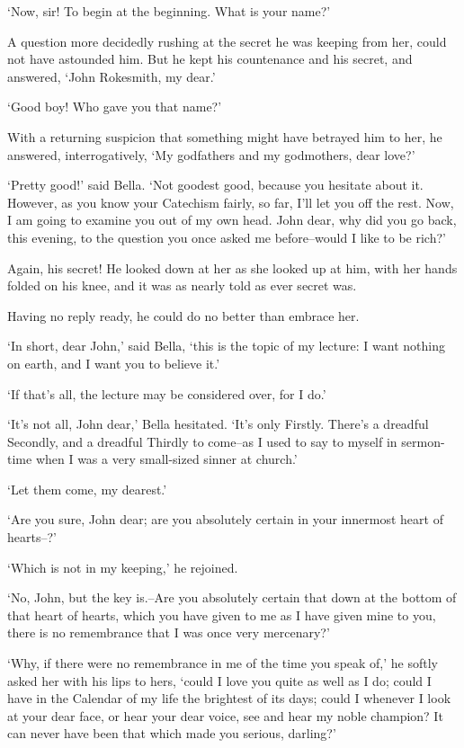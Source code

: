 ‘Now, sir! To begin at the beginning. What is your name?’

A question more decidedly rushing at the secret he was keeping from
her, could not have astounded him. But he kept his countenance and his
secret, and answered, ‘John Rokesmith, my dear.’

‘Good boy! Who gave you that name?’

With a returning suspicion that something might have betrayed him to
her, he answered, interrogatively, ‘My godfathers and my godmothers,
dear love?’

‘Pretty good!’ said Bella. ‘Not goodest good, because you hesitate about
it. However, as you know your Catechism fairly, so far, I’ll let you off
the rest. Now, I am going to examine you out of my own head. John dear,
why did you go back, this evening, to the question you once asked me
before--would I like to be rich?’

Again, his secret! He looked down at her as she looked up at him, with
her hands folded on his knee, and it was as nearly told as ever secret
was.

Having no reply ready, he could do no better than embrace her.

‘In short, dear John,’ said Bella, ‘this is the topic of my lecture: I
want nothing on earth, and I want you to believe it.’

‘If that’s all, the lecture may be considered over, for I do.’

‘It’s not all, John dear,’ Bella hesitated. ‘It’s only Firstly. There’s
a dreadful Secondly, and a dreadful Thirdly to come--as I used to say to
myself in sermon-time when I was a very small-sized sinner at church.’

‘Let them come, my dearest.’

‘Are you sure, John dear; are you absolutely certain in your innermost
heart of hearts--?’

‘Which is not in my keeping,’ he rejoined.

‘No, John, but the key is.--Are you absolutely certain that down at the
bottom of that heart of hearts, which you have given to me as I
have given mine to you, there is no remembrance that I was once very
mercenary?’

‘Why, if there were no remembrance in me of the time you speak of,’ he
softly asked her with his lips to hers, ‘could I love you quite as well
as I do; could I have in the Calendar of my life the brightest of its
days; could I whenever I look at your dear face, or hear your dear
voice, see and hear my noble champion? It can never have been that which
made you serious, darling?’

